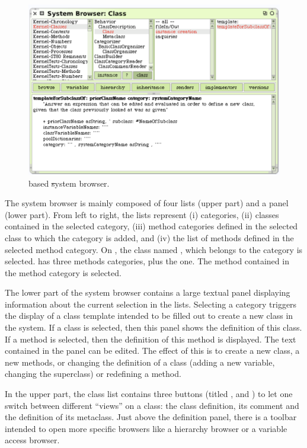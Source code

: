 \documentclass[a4paper,10pt,twoside]{book}
\begin{document}
\begin{figure}[!ht]
\begin{center}
\includegraphics[scale=0.30]{obbrowser}
\caption{\ob based \st system browser.} 
\end{center}
\end{figure}

The system browser is mainly composed of four lists (upper part) and a panel (lower part). From left to right, the lists represent (i) categories, (ii) classes contained in the selected category, (iii) method categories defined in the selected class to which the  category is added, and (iv) the list of methods defined in the selected method category. On , the class named , which belongs to the category  is selected.  has three methods categories, plus the  one. The method  contained in the  method category is selected.

The lower part of the system browser contains a large textual panel displaying information about the current selection in the lists. Selecting a category triggers the display of a class template intended to be filled out to create a new class in the system. If a class is selected, then this panel shows the definition of this class. If a method is selected, then the definition of this method is displayed. The text contained in the panel can be edited. The effect of this is to create a new class, a new methods, or changing the definition of a class (\eg adding a new variable, changing the superclass) or redefining a method.

In the upper part, the class list contains three buttons (titled ,  and ) to let one switch between different ``views'' on a class: the class definition, its comment and the definition of its metaclass. Just above the definition panel, there is a toolbar intended to open more specific browsers like a hierarchy browser or a variable access browser.
\end{document}
